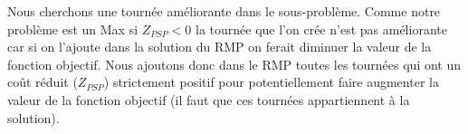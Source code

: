 Nous cherchons une tournée améliorante dans le sous-problème. 
Comme notre problème est un Max si $Z_{PSP} < 0$ la tournée que l'on crée n'est pas améliorante car si on l'ajoute dans la solution du RMP on ferait diminuer la valeur de la fonction objectif.
Nous ajoutons donc dans le RMP toutes les tournées qui ont un coût réduit ($Z_{PSP}$) strictement positif pour potentiellement faire augmenter la valeur de la fonction objectif (il faut que ces tournées appartiennent à la solution).

